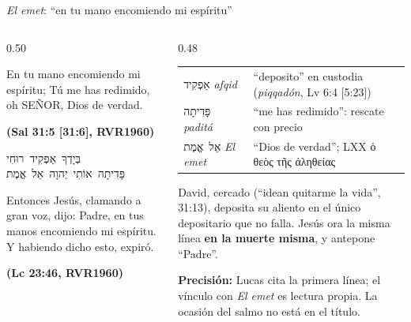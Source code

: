 \documentclass[hyperref={bookmarks=false},aspectratio=169]{beamer}
\newcommand{\heb}[1]{\mbox{\foreignlanguage{hebrew}{#1}}}
\newcommand{\grc}[1]{\foreignlanguage{ancientgreek}{#1}}
\newcommand{\SENOR}{S{\fontsize{0.78em}{1em}\selectfont EÑOR}}
\newcommand{\fuente}[1]{\par\hfill{\upshape\bfseries\footnotesize\textcolor{azul}{#1}}}
\newcommand{\destacar}[1]{\textbf{\textcolor{azul}{#1}}}
\newcommand{\precision}[1]{{\footnotesize\color{gris}\textbf{Precisión:} #1}}
\begin{document}
\begin{frame}{\emph{El emet}: ``en tu mano encomiendo mi espíritu''}
\begin{columns}[t,onlytextwidth]
\begin{column}{0.50\textwidth}
\begin{cita}En tu mano encomiendo mi espíritu; Tú me has redimido, oh \SENOR{}, Dios de verdad.\fuente{(Sal 31:5 [31:6], RVR1960)}\end{cita}
\begin{center}\small\heb{בְּיָדְךָ אַפְקִיד רוּחִי}\\ \heb{פָּדִיתָה אוֹתִי יְהוָה אֵל אֱמֶת}\end{center}
\begin{cita}Entonces Jesús, clamando a gran voz, dijo: Padre, en tus manos encomiendo mi espíritu. Y habiendo dicho esto, expiró.\fuente{(Lc 23:46, RVR1960)}\end{cita}
\end{column}
\begin{column}{0.48\textwidth}\scriptsize
\renewcommand{\arraystretch}{1.15}
\begin{tabular}{@{}>{\RaggedRight\arraybackslash}p{1.9cm}>{\RaggedRight\arraybackslash}p{3.8cm}@{}}
\toprule
\heb{אַפְקִיד} \emph{afqid} & ``deposito'' en custodia (\emph{piqqadón}, Lv 6:4 [5:23]) \\
\heb{פָּדִיתָה} \emph{paditá} & ``me has redimido'': rescate con precio \\
\heb{אֵל אֱמֶת} \emph{El emet} & ``Dios de verdad''; LXX \grc{ὁ θεὸς τῆς ἀληθείας} \\
\bottomrule
\end{tabular}\par\medskip
\small David, cercado (``idean quitarme la vida'', 31:13), deposita su aliento en el único depositario que no falla. Jesús ora la misma línea \destacar{en la muerte misma}, y antepone ``Padre''.\par\smallskip
\precision{Lucas cita la primera línea; el vínculo con \emph{El emet} es lectura propia. La ocasión del salmo no está en el título.}
\end{column}
\end{columns}
\end{frame}
\end{document}
